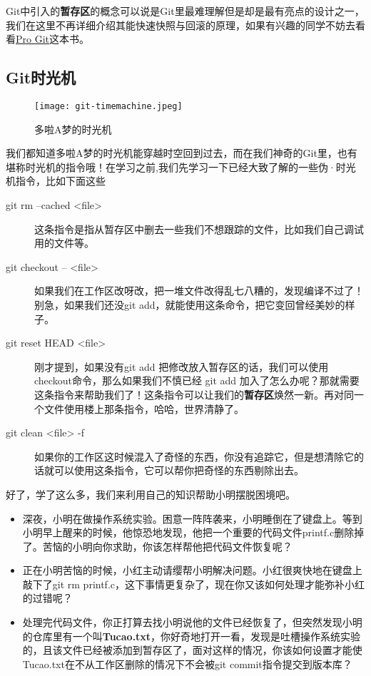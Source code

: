 Git中引入的\textbf{暂存区}的概念可以说是Git里最难理解但是却是最有亮点的设计之一，我们在这里不再详细介绍其能快速快照与回滚的原理，如果有兴趣的同学不妨去看看\href{http://download.csdn.net/detail/shuangde800/5977817}{Pro Git}这本书。

\subsection{Git时光机}

\begin{figure}[htbp]
	\centering
	\texttt{[image: git-timemachine.jpeg]}
	\caption{多啦A梦的时光机}
\end{figure}

我们都知道多啦A梦的时光机能穿越时空回到过去，而在我们神奇的Git里，也有堪称时光机的指令哦！在学习之前,我们先学习一下已经大致了解的一些伪·时光机指令，比如下面这些

\begin{description}
\item[git rm --cached <file>] 这条指令是指从暂存区中删去一些我们不想跟踪的文件，比如我们自己调试用的文件等。
\item[git checkout -- <file>] 如果我们在工作区改呀改，把一堆文件改得乱七八糟的，发现编译不过了！别急，如果我们还没git add，就能使用这条命令，把它变回曾经美妙的样子。
\item[git reset HEAD <file>] 刚才提到，如果没有git add 把修改放入暂存区的话，我们可以使用checkout命令，那么如果我们不慎已经 git add 加入了怎么办呢？那就需要这条指令来帮助我们了！这条指令可以让我们的\textbf{暂存区}焕然一新。再对同一个文件使用楼上那条指令，哈哈，世界清静了。
\item[git clean <file> -f] 如果你的工作区这时候混入了奇怪的东西，你没有追踪它，但是想清除它的话就可以使用这条指令，它可以帮你把奇怪的东西剔除出去。
\end{description}

好了，学了这么多，我们来利用自己的知识帮助小明摆脱困境吧。

\begin{thinking}\label{think-小明的困境}
	\begin{itemize}
	  \item 深夜，小明在做操作系统实验。困意一阵阵袭来，小明睡倒在了键盘上。等到小明早上醒来的时候，他惊恐地发现，他把一个重要的代码文件printf.c删除掉了。苦恼的小明向你求助，你该怎样帮他把代码文件恢复呢？
		\item 正在小明苦恼的时候，小红主动请缨帮小明解决问题。小红很爽快地在键盘上敲下了git rm printf.c，这下事情更复杂了，现在你又该如何处理才能弥补小红的过错呢？
		\item 处理完代码文件，你正打算去找小明说他的文件已经恢复了，但突然发现小明的仓库里有一个叫\textbf{Tucao.txt}，你好奇地打开一看，发现是吐槽操作系统实验的，且该文件已经被添加到暂存区了，面对这样的情况，你该如何设置才能使Tucao.txt在不从工作区删除的情况下不会被git commit指令提交到版本库？
	\end{itemize}
\end{thinking}

